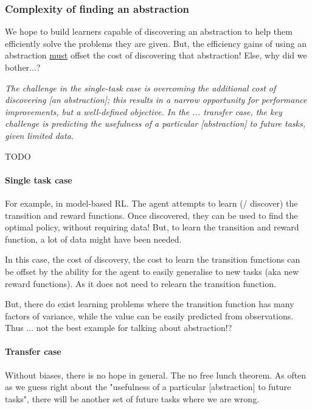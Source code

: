 \subsubsection{Complexity of finding an abstraction}

We hope to build learners capable of discovering an abstraction to help them efficiently solve the problems they are given.
But, the efficiency gains of using an abstraction \underline{must} offset the cost of
discovering that abstraction! Else, why did we bother...?

\begin{displayquote}
\textit{The challenge in the single-task case is overcoming the additional cost of discovering [an abstraction];
this results in a narrow opportunity for performance improvements, but a well-defined objective.
In the ... transfer case, the key challenge is predicting the usefulness of a particular [abstraction] to future tasks, given limited data.}\cite{Konidaris2019}
\end{displayquote}

{\color{red}TODO}

\paragraph{Single task case}

For example, in model-based RL. The agent attempts to learn (/ discover) the
transition and reward functions. Once discovered, they can be used to find the optimal policy, without requiring data!
But, to learn the transition and reward function, a lot of data might have been needed.

In this case, the cost of discovery, the cost to learn the transition functions can be offset
by the ability for the agent to easily generalise to new tasks (aka new reward functions).
As it does not need to relearn the transition function.

But, there do exist learning problems where the transition function has many
factors of variance, while the value can be easily predicted from observations.
Thus ...
{\color{red}not the best example for talking about abstraction!?}

\paragraph{Transfer case}

Without biases, there is no hope in general. The no free lunch theorem.
As often as we guess right about the "usefulness of a particular [abstraction] to future tasks",
there will be another set of future tasks where we are wrong.

